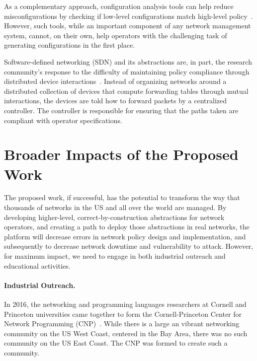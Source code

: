 As a complementary approach, configuration analysis tools can help
reduce misconfigurations by checking if low-level configurations match
high-level policy~\cite{batfish,feamster+:rcc}. However, such tools, while
an important component of any network management system,
cannot, on their own, help operators with the challenging task of generating
configurations in the first place.


Software-defined networking (SDN) and its abstractions
are, in part, the research
community's response to the difficulty of maintaining policy
compliance through distributed device interactions~\cite{ethane}.
Instead of organizing networks around a distributed
collection of devices that compute forwarding tables through
mutual interactions, the devices are told how to
forward packets by a centralized controller. The controller is responsible for ensuring that the
paths taken are compliant with operator specifications.



\section{Broader Impacts of the Proposed Work}
\label{sec:impact}

The proposed work, if successful, has the potential to transform the way
that thousands of networks in the US and all over the world are managed.
By developing higher-level, correct-by-construction abstractions for
network operators, and creating a path to deploy those abstractions
in real networks, the \Name platform will decrease
errors in network policy design and implementation, and subsequently
to decrease network downtime and vulnerability to attack.  However,
for maximum impact, we need to engage in both industrial outreach and
educational activities.

\paragraph*{Industrial Outreach.}
In 2016, the networking and programming languages
researchers at Cornell and Princeton universities came together
to form the Cornell-Princeton Center for Network 
Programming (CNP)~\cite{center-for-network-programming}.
While there is a large an vibrant networking community on the US
West Coast, centered in the Bay Area, there was no such community on
the US East Coast.  The CNP was formed to create such a community.

